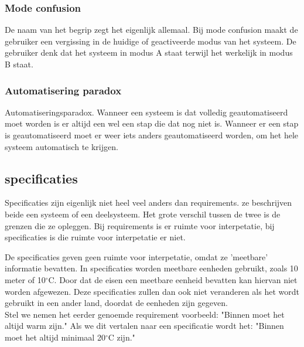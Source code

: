 \documentclass{article}%
\begin{document}
\subsubsection{Mode confusion}
De naam van het begrip zegt het eigenlijk allemaal. Bij mode confusion maakt de gebruiker een vergissing in de huidige of geactiveerde modus van het systeem. De gebruiker denk dat het systeem in modus A staat terwijl het werkelijk in modus B staat. 

\subsubsection{Automatisering paradox}
Automatiseringsparadox. Wanneer een systeem is dat volledig geautomatiseerd moet worden is er altijd een wel een stap die dat nog niet is. Wanneer er een stap is geautomatiseerd moet er weer iets anders geautomatiseerd worden, om het hele systeem automatisch te krijgen.

\subsection{specificaties}
Specificaties zijn eigenlijk niet heel veel anders dan requirements. ze beschrijven beide een systeem of een deelsysteem. Het grote verschil tussen de twee is de grenzen die ze opleggen. Bij requirements is er ruimte voor interpetatie, bij specificaties is die ruimte voor interpetatie er niet.

De specificaties geven geen ruimte voor interpetatie, omdat ze 'meetbare' informatie bevatten. In specificaties worden meetbare eenheden gebruikt, zoals 10 meter of 10$^{\circ}$C. Door dat de eisen een meetbare eenheid bevatten kan hiervan niet worden afgewezen. Deze specificaties zullen dan ook niet veranderen als het wordt gebruikt in een ander land, doordat de eenheden zijn gegeven.
\\

Stel we nemen het eerder genoemde requirement voorbeeld: "Binnen moet het altijd warm zijn." Als we dit vertalen naar een specificatie wordt het: "Binnen moet het altijd minimaal 20$^{\circ}$C zijn."




\clearpage %
\end{document}
